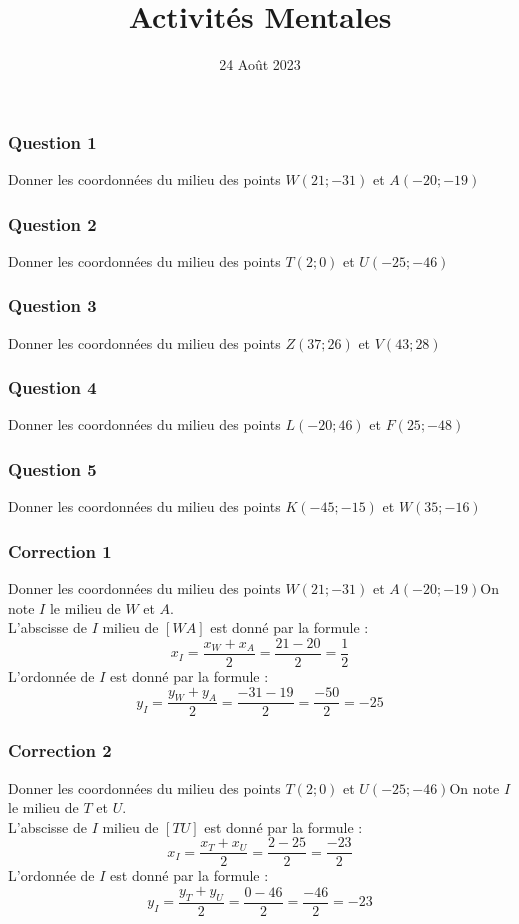 \documentclass[15pt, mathserif]{beamer}
\title{Activités Mentales}
\date{24 Août 2023}
\begin{document}
\begin{frame}
    \titlepage
\end{frame}

\begin{frame} 
	\frametitle{Question 1}
Donner les coordonnées du milieu des points $W(21;-31)$ et $A(-20;-19)$\end{frame}


\begin{frame} 
	\frametitle{Question 2}
Donner les coordonnées du milieu des points $T(2;0)$ et $U(-25;-46)$\end{frame}


\begin{frame} 
	\frametitle{Question 3}
Donner les coordonnées du milieu des points $Z(37;26)$ et $V(43;28)$\end{frame}


\begin{frame} 
	\frametitle{Question 4}
Donner les coordonnées du milieu des points $L(-20;46)$ et $F(25;-48)$\end{frame}


\begin{frame} 
	\frametitle{Question 5}
Donner les coordonnées du milieu des points $K(-45;-15)$ et $W(35;-16)$\end{frame}


\begin{frame}
\vspace{-10mm}
	\frametitle{Correction 1}
Donner les coordonnées du milieu des points $W(21;-31)$ et $A(-20;-19)$On note $I$ le milieu de $W$ et $A$. \\ L'abscisse de $I$ milieu de $[WA]$ est donné par la formule : $$ x_I = \frac{x_W+x_A}{2} = \frac{21-20}{2}= \dfrac{1}{2}$$ L'ordonnée de $I$ est donné par la formule : $$ y_I = \frac{y_W+y_A}{2} = \frac{-31-19}{2}= \dfrac{-50}{2}=-25$$\end{frame}


\begin{frame}
\vspace{-10mm}
	\frametitle{Correction 2}
Donner les coordonnées du milieu des points $T(2;0)$ et $U(-25;-46)$On note $I$ le milieu de $T$ et $U$. \\ L'abscisse de $I$ milieu de $[TU]$ est donné par la formule : $$ x_I = \frac{x_T+x_U}{2} = \frac{2-25}{2}= \dfrac{-23}{2}$$ L'ordonnée de $I$ est donné par la formule : $$ y_I = \frac{y_T+y_U}{2} = \frac{0-46}{2}= \dfrac{-46}{2}=-23$$\end{frame}
\end{document}
